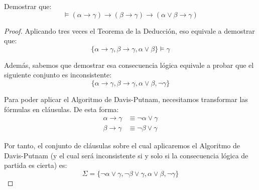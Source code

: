 \documentclass[12pt]{article}
\begin{document}
    \begin{ejercicio}
        Demostrar que:
        \begin{equation*}
            \vDash \left(\alpha \rightarrow \gamma\right) \rightarrow \left(\beta \rightarrow \gamma\right) \rightarrow \left(\alpha \vee \beta \rightarrow \gamma\right)
        \end{equation*}
        \begin{proof}
            Aplicando tres veces el Teorema de la Deducción, eso equivale a demostrar que:
            \begin{equation*}
                \{\alpha \rightarrow \gamma, \beta \rightarrow \gamma, \alpha \vee \beta\} \vDash \gamma
            \end{equation*}

            Además, sabemos que demostrar esa consecuencia lógica equivale a probar que el siguiente conjunto es inconsistente:
            \begin{equation*}
                \{\alpha \rightarrow \gamma, \beta \rightarrow \gamma, \alpha \vee \beta, \neg \gamma\}
            \end{equation*}

            Para poder aplicar el Algoritmo de Davis-Putnam, necesitamos transformar las fórmulas en cláusulas. De esta forma:
            \begin{align*}
                \alpha \rightarrow \gamma &\equiv \neg \alpha \vee \gamma\\
                \beta \rightarrow \gamma &\equiv \neg \beta \vee \gamma
            \end{align*}

            Por tanto, el conjunto de cláusulas sobre el cual aplicaremos el Algoritmo de Davis-Putnam (y el cual será inconsistente si y solo si la consecuencia lógica de partida es cierta) es:
            \begin{equation*}
                \Sigma = \{\neg \alpha \vee \gamma, \neg \beta \vee \gamma, \alpha \vee \beta, \neg \gamma\}
            \end{equation*}
        \end{proof}
    \end{ejercicio}
\end{document}
